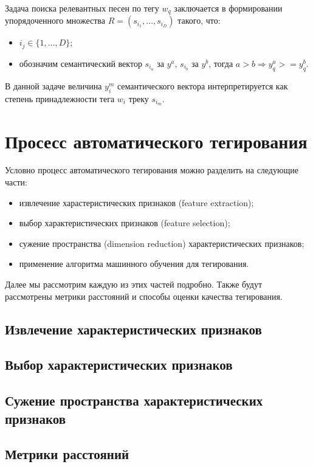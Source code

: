 Задача поиска релевантных песен по тегу $w_q$ заключается в формировании упорядоченного множества $R = (s_{i_1}, \ldots, s_{i_D})$ такого, что:
\begin{itemize}
 \item $i_j \in \{1, \ldots, D \}$;
 \item обозначим семантический вектор $s_{i_a}$ за $y^a$, $s_{i_b}$ \ld за $y^b$, тогда $a > b \Rightarrow y^a_q >= y^b_q $.
\end{itemize}
В данной задаче величина $y^m_i$ семантического вектора интерпретируется как степень принадлежности тега $w_i$ треку $s_{i_m}$. 
 
\section{Просесс автоматического тегирования}

Условно процесс автоматического тегирования можно разделить на следующие части:
\begin{itemize}
 \item извлечение харастеристических признаков (feature extraction);
 \item выбор характеристических признаков (feature selection);
 \item сужение пространства (dimension reduction) характеристических признаков;
 \item применение алгоритма машинного обучения для тегирования.
\end{itemize}

Далее мы рассмотрим каждую из этих частей подробно. Также будут рассмотрены метрики расстояний и способы оценки качества тегирования.

\subsection{Извлечение характеристических признаков}


\subsection{Выбор характеристических признаков}
\subsection{Сужение пространства характеристических признаков}
\subsection{Метрики расстояний}

